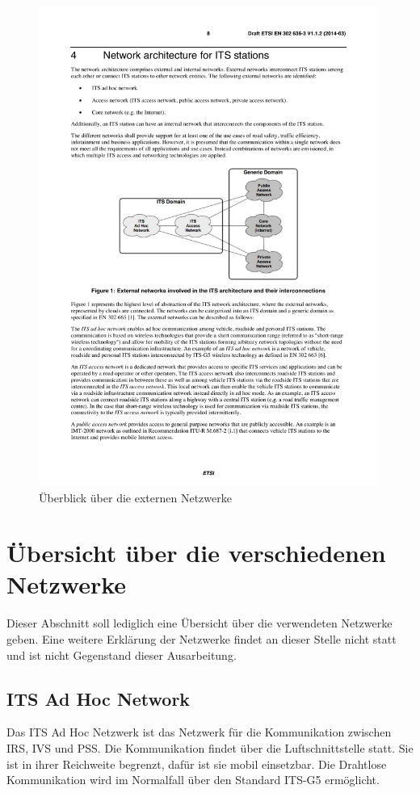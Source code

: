 \begin{figure}[h]
	\includegraphics[width=0.99\textwidth]{content/images/02_architektur/uebersichtExterneNetzwerke.pdf}
	\caption{Überblick über die externen Netzwerke \cite{etsi302636-3}}
	\label{fig:architektur_ueberblickNetzwerke}
\end{figure}

\section{Übersicht über die verschiedenen Netzwerke}
Dieser Abschnitt soll lediglich eine Übersicht über die verwendeten Netzwerke geben. Eine weitere Erklärung der Netzwerke findet an dieser Stelle nicht statt und ist nicht Gegenstand dieser Ausarbeitung.

\subsection{ITS Ad Hoc Network}
Das \ac{ITS} Ad Hoc Netzwerk ist das Netzwerk für die Kommunikation zwischen \ac{IRS}, \ac{IVS} und \ac{PSS}. Die Kommunikation findet über die Luftschnittstelle statt. Sie ist in ihrer Reichweite begrenzt, dafür ist sie mobil einsetzbar. Die Drahtlose Kommunikation wird im Normalfall über den Standard ITS-G5 ermöglicht.


